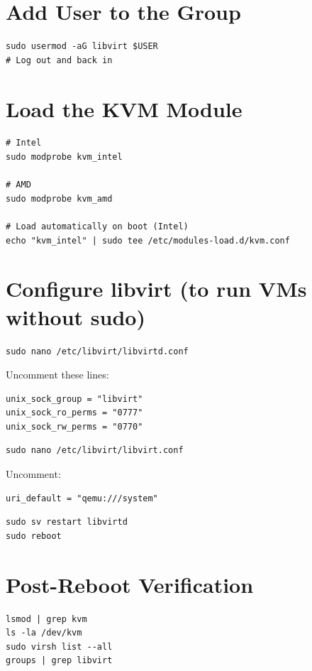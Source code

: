 \documentclass[12pt, a4paper]{book}
\begin{document}
\section{Add User to the Group}
\begin{lstlisting}
sudo usermod -aG libvirt $USER
# Log out and back in
\end{lstlisting}

\section{Load the KVM Module}
\begin{lstlisting}
# Intel
sudo modprobe kvm_intel

# AMD
sudo modprobe kvm_amd

# Load automatically on boot (Intel)
echo "kvm_intel" | sudo tee /etc/modules-load.d/kvm.conf
\end{lstlisting}

\section{Configure libvirt (to run VMs without sudo)}
\begin{lstlisting}
sudo nano /etc/libvirt/libvirtd.conf
\end{lstlisting}

Uncomment these lines:
\begin{lstlisting}
unix_sock_group = "libvirt"
unix_sock_ro_perms = "0777"
unix_sock_rw_perms = "0770"
\end{lstlisting}

\begin{lstlisting}
sudo nano /etc/libvirt/libvirt.conf
\end{lstlisting}

Uncomment:
\begin{lstlisting}
uri_default = "qemu:///system"
\end{lstlisting}

\begin{lstlisting}
sudo sv restart libvirtd
sudo reboot
\end{lstlisting}

\section{Post-Reboot Verification}
\begin{lstlisting}
lsmod | grep kvm
ls -la /dev/kvm
sudo virsh list --all
groups | grep libvirt
\end{lstlisting}
\end{document}
